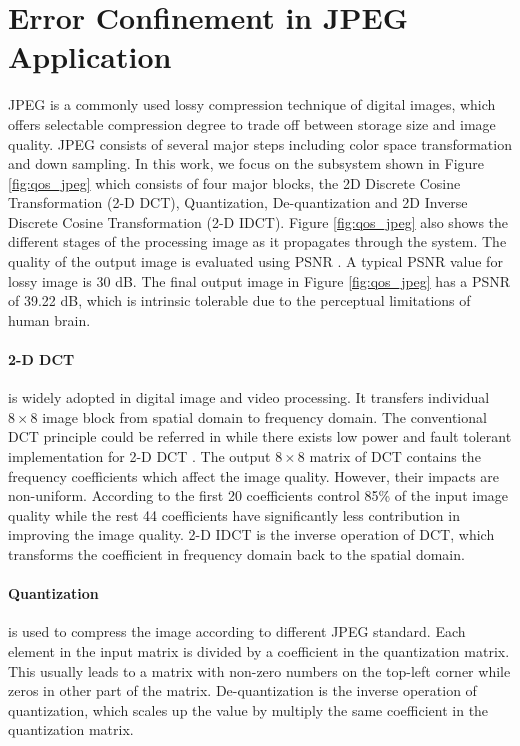 \section{Error Confinement in JPEG Application} \label{sec:jpeg}

JPEG is a commonly used lossy compression technique of digital images, which offers selectable compression degree to trade off between storage size and image quality. JPEG consists of several major steps including color space transformation and down sampling. In this work, we focus on the subsystem shown in Figure \ref{fig:qos_jpeg} which consists of four major blocks, the 2D Discrete Cosine Transformation (2-D DCT), Quantization, De-quantization and 2D Inverse Discrete Cosine Transformation (2-D IDCT). Figure \ref{fig:qos_jpeg} also shows the different stages of the processing image as it propagates through the system. The quality of the output image is evaluated using PSNR \cite{huynh2008scope}. A typical PSNR value for lossy image is 30 dB. The final output image in Figure \ref{fig:qos_jpeg} has a PSNR of 39.22 dB, which is intrinsic tolerable due to the perceptual limitations of human brain.

\paragraph{2-D DCT} is widely adopted in digital image and video processing. It transfers individual $8 \times 8$ image block from spatial domain to frequency domain. The conventional DCT principle could be referred in \cite{gonzalez2009digital} while there exists low power and fault tolerant implementation for 2-D DCT \cite{august2004low}\cite{banerjee2007process}. The output $8 \times 8$ matrix of DCT contains the frequency coefficients which affect the image quality. However, their impacts are non-uniform. According to \cite{banerjee2007process} the first 20 coefficients control 85\% of the input image quality while the rest 44 coefficients have significantly less contribution in improving the image quality. 2-D IDCT is the inverse operation of DCT, which transforms the coefficient in frequency domain back to the spatial domain.

\paragraph{Quantization} is used to compress the image according to different JPEG standard. Each element in the input matrix is divided by a coefficient in the quantization matrix. This usually leads to a matrix with non-zero numbers on the top-left corner while zeros in other part of the matrix. De-quantization is the inverse operation of quantization, which scales up the value by multiply the same coefficient in the quantization matrix.

